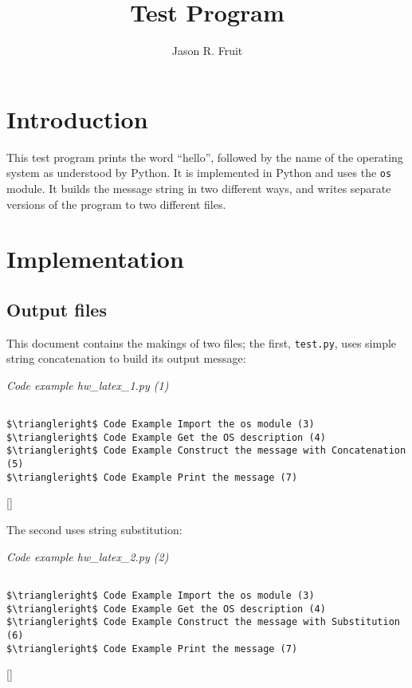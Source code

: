 \documentclass{article}
\title{Test Program}
\author{Jason R. Fruit}
\begin{document}
\maketitle
\tableofcontents

\section{Introduction}

This test program prints the word ``hello'', followed by the name of
the operating system as understood by Python.  It is implemented in
Python and uses the \texttt{os} module.  It builds the message string
in two different ways, and writes separate versions of the program to
two different files.

\section{Implementation}

\subsection{Output files}

This document contains the makings of two files; the first,
\texttt{test.py}, uses simple string concatenation to build its output
message:

\label{pyweb1}
    \begin{flushleft}
    \textit{Code example hw_latex_1.py (1)}
    \begin{Verbatim}[commandchars=\\\{\},codes={\catcode`$=3\catcode`^=7},frame=single]

$\triangleright$ Code Example Import the os module (3)
$\triangleright$ Code Example Get the OS description (4)
$\triangleright$ Code Example Construct the message with Concatenation (5)
$\triangleright$ Code Example Print the message (7)

\end{Verbatim}
[]
\end{flushleft}


The second uses string substitution:

\label{pyweb2}
    \begin{flushleft}
    \textit{Code example hw_latex_2.py (2)}
    \begin{Verbatim}[commandchars=\\\{\},codes={\catcode`$=3\catcode`^=7},frame=single]

$\triangleright$ Code Example Import the os module (3)
$\triangleright$ Code Example Get the OS description (4)
$\triangleright$ Code Example Construct the message with Substitution (6)
$\triangleright$ Code Example Print the message (7)

\end{Verbatim}
[]
\end{flushleft}
\end{document}
